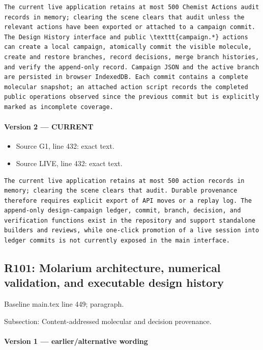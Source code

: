 \documentclass[11pt]{article}
\begin{document}
\begin{lstlisting}
The current live application retains at most 500 Chemist Actions audit records in memory; clearing the scene clears that audit unless the relevant actions have been exported or attached to a campaign commit. The Design History interface and public \texttt{campaign.*} actions can create a local campaign, atomically commit the visible molecule, create and restore branches, record decisions, merge branch histories, and verify the append-only record. Campaign JSON and the active branch are persisted in browser IndexedDB. Each commit contains a complete molecular snapshot; an attached action script records the completed public operations observed since the previous commit but is explicitly marked as incomplete coverage.
\end{lstlisting}

\paragraph{Version 2 --- CURRENT}

\begin{itemize}[leftmargin=*]
\item Source G1, line 432: exact text.
\item Source LIVE, line 432: exact text.
\end{itemize}

\begin{lstlisting}
The current live application retains at most 500 action records in memory; clearing the scene clears that audit. Durable provenance therefore requires explicit export of API moves or a replay log. The append-only design-campaign ledger, commit, branch, decision, and verification functions exist in the repository and support standalone builders and reviews, while one-click promotion of a live session into ledger commits is not currently exposed in the main interface.
\end{lstlisting}

\subsection{R101: Molarium architecture, numerical validation, and executable design history}

Baseline main.tex line 449; paragraph.

Subsection: Content-addressed molecular and decision provenance.

\paragraph{Version 1 --- earlier/alternative wording}
\end{document}

